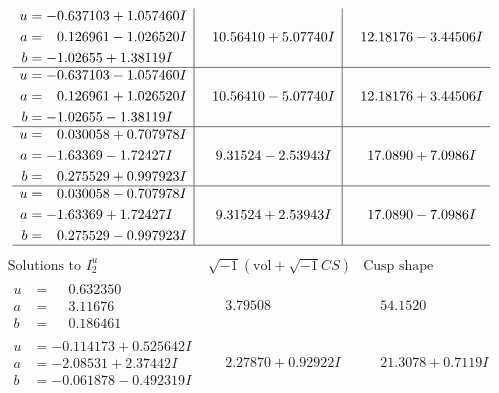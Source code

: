 \documentclass[1p]{elsarticle_modified}
\theoremstyle{definition}
\newcommand{\I}{\sqrt{-1}}
\begin{document}
$$\begin{array}{c|c|c}
\begin{aligned}
u &= -0.637103 + 1.057460 I \\
a &= \phantom{-}0.126961 - 1.026520 I \\
b &= -1.02655 + 1.38119 I\end{aligned}
 & \phantom{-}10.56410 + 5.07740 I & \phantom{-}12.18176 - 3.44506 I \\ \hline\begin{aligned}
u &= -0.637103 - 1.057460 I \\
a &= \phantom{-}0.126961 + 1.026520 I \\
b &= -1.02655 - 1.38119 I\end{aligned}
 & \phantom{-}10.56410 - 5.07740 I & \phantom{-}12.18176 + 3.44506 I \\ \hline\begin{aligned}
u &= \phantom{-}0.030058 + 0.707978 I \\
a &= -1.63369 - 1.72427 I \\
b &= \phantom{-}0.275529 + 0.997923 I\end{aligned}
 & \phantom{-}9.31524 - 2.53943 I & \phantom{-}17.0890 + 7.0986 I \\ \hline\begin{aligned}
u &= \phantom{-}0.030058 - 0.707978 I \\
a &= -1.63369 + 1.72427 I \\
b &= \phantom{-}0.275529 - 0.997923 I\end{aligned}
 & \phantom{-}9.31524 + 2.53943 I & \phantom{-}17.0890 - 7.0986 I\\
 \hline 
 \end{array}$$\newpage$$\begin{array}{c|c|c}  
\text{Solutions to }I^u_{2}& \I (\text{vol} + \sqrt{-1}CS) & \text{Cusp shape}\\
 \hline 
\begin{aligned}
u &= \phantom{-}0.632350\phantom{ +0.000000I} \\
a &= \phantom{-}3.11676\phantom{ +0.000000I} \\
b &= \phantom{-}0.186461\phantom{ +0.000000I}\end{aligned}
 & \phantom{-}3.79508\phantom{ +0.000000I} & \phantom{-}54.1520\phantom{ +0.000000I} \\ \hline\begin{aligned}
u &= -0.114173 + 0.525642 I \\
a &= -2.08531 + 2.37442 I \\
b &= -0.061878 - 0.492319 I\end{aligned}
 & \phantom{-}2.27870 + 0.92922 I & \phantom{-}21.3078 + 0.7119 I \\ \hline\begin{aligned}

\end{aligned}
\end{array}$$
\end{document}
